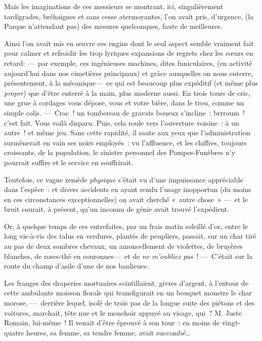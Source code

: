 \documentclass[french,twoside]{book} %
\begin{document}
Mais les imaginations de ces messieurs se montrant, ici, singulièrement tardigrades, bréhaignes et sans cesse atermoyantes, l’on avait pris, d’urgence, (la Parque n’attendant pas) des mesures quelconques, faute de meilleures.\par
Ainsi l’on avait mis en œuvre ces engins dont le seul aspect semble vraiment fait pour calmer et refroidir les trop lyriques expansions de regrets chez les cœurs en retard: — par exemple, ces ingénieuses machines, dites funiculaires, (en activité aujourd’hui dans nos cimetières principaux) et grâce auxquelles on nous enterre, présentement, à la mécanique— ce qui est beaucoup plus expéditif (et même plus \emph{propre}) que d’être enterré à la main, plus moderne aussi. En trois tours de cric, une grue à cordages vous dépose, vous et votre bière, dans le trou, comme un simple colis. — Crac ! un tombereau de gravats boueux s’incline : brrroum ! c’est fait. Vous voilà disparu. Puis, cela roule vers l’ouverture voisine :   à un autre ! et même jeu. Sans cette rapidité, il saute aux yeux que l’administration surmènerait en vain ses noirs employés : vu l’affluence, et les chiffres, toujours croissants, de la population, le sinistre personnel des Pompes-Funèbres n’y pourrait suffire et le service en souffrirait.\par
Toutefois, ce vague remède \emph{physique} s’était vu d’une impuissance appréciable dans l’espèce : et divers accidents en ayant rendu l’usage inopportun (du moins en ces circonstances exceptionnelles) on avait cherché « autre chose » — et le bruit courait, à présent, qu’un inconnu de génie avait trouvé l’expédient.\par
Or, à quelque temps de ces entrefaites, par un frais matin soleillé d’or, entre le long vis-à-vis des talus en verdures, plantés de peupliers, passait, sur un char tiré au pas de deux sombres chevaux, un amoncellement de violettes, de bruyères blanches, de roses-thé en couronnes— et de \emph{ne m’oubliez pas} ! — C’était sur la route du champ d’asile d’une de nos banlieues.\par
   Les franges des draperies mortuaires scintillaient, givres d’argent, à l’entour de cette ambulante moisson florale qui transfigurait en un bouquet monstre le char morose, — derrière lequel, isolé de trois pas de la longue suite des piétons et des voitures, marchait, tête nue et le mouchoir appuyé au visage, qui ? M. Juste Romain, lui-même ! Il venait d’être éprouvé à son tour : en moins de vingt-quatre heures, sa femme, sa tendre femme, avait succombé…\par
\end{document}

